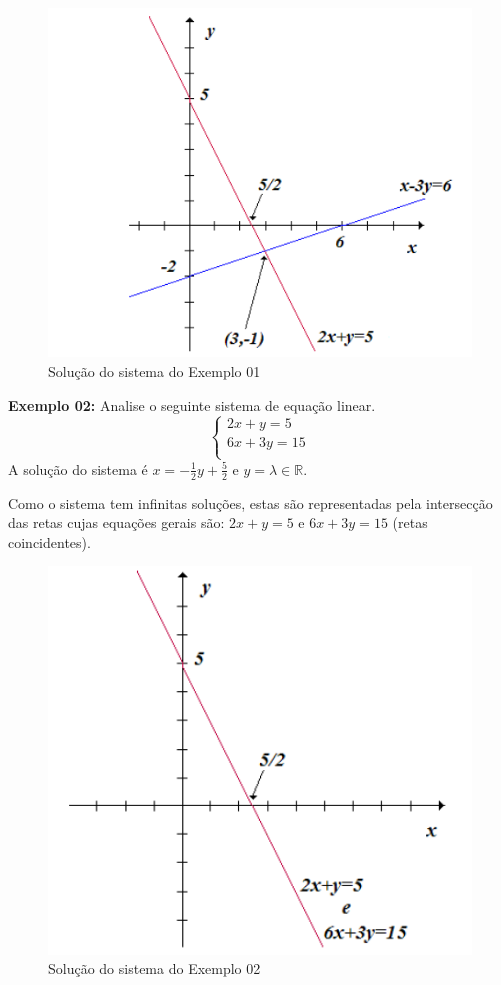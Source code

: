 \documentclass[oneside,a4paper,12pt]{article}
\begin{document}
\begin{figure}[!h]
	\centering
	\includegraphics[scale=0.6]{s1}
	\caption{Solução do sistema do Exemplo 01}
	\label{s1}
\end{figure}

\textbf{Exemplo 02: }
Analise o seguinte sistema de equação linear.
$$
\left\{
\begin{array}{c}
2x + y = 5 \\
6x + 3y = 15 \\
\end{array}
\right.
$$
A solução do sistema é $x = -\frac{1}{2}y+\frac{5}{2}$ e $y = \lambda \in \mathbb{R}$.

Como o sistema tem infinitas soluções, estas são representadas pela intersecção das
retas cujas equações gerais são: $2x + y = 5$ e $6x + 3y = 15$ (retas coincidentes).

\begin{figure}[!h]
	\centering
	\includegraphics[scale=0.6]{s2}
	\caption{Solução do sistema do Exemplo 02}
	\label{s2}
\end{figure}
\end{document}
